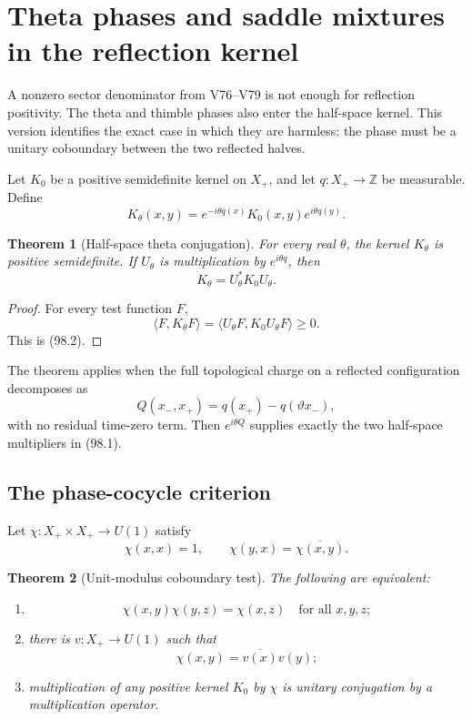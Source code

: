 \documentclass[11pt]{article}
\newtheorem{theorem}{Theorem}[section]
\begin{document}
\section{Theta phases and saddle mixtures in the reflection kernel}
\label{sec:v11v98}

A nonzero sector denominator from V76--V79 is not enough for
reflection positivity.  The theta and thimble phases also enter the
half-space kernel.  This version identifies the exact case in which
they are harmless: the phase must be a unitary coboundary between the
two reflected halves.

Let \(K_0\) be a positive semidefinite kernel on \(X_+\), and let
\(q:X_+\to\mathbb Z\) be measurable.  Define
\[
 K_\theta(x,y)
       =e^{-i\theta q(x)}K_0(x,y)e^{i\theta q(y)}.            \tag{98.1}
\]

\begin{theorem}[Half-space theta conjugation]
\label{thm:v11v98-unitary}
For every real \(\theta\), the kernel \(K_\theta\) is positive
semidefinite.  If \(U_\theta\) is multiplication by
\(e^{i\theta q}\), then
\[
                              K_\theta=U_\theta^*K_0U_\theta. \tag{98.2}
\]
\end{theorem}

\begin{proof}
For every test function \(F\),
\[
 \langle F,K_\theta F\rangle
 =\langle U_\theta F,K_0U_\theta F\rangle\ge0.
\]
This is (98.2).
\end{proof}

The theorem applies when the full topological charge on a reflected
configuration decomposes as
\[
                      Q(x_-,x_+)=q(x_+)-q(\vartheta x_-),    \tag{98.3}
\]
with no residual time-zero term.  Then
\(e^{i\theta Q}\) supplies exactly the two half-space multipliers in
(98.1).

\subsection{The phase-cocycle criterion}

Let \(\chi:X_+\times X_+\to U(1)\) satisfy
\[
 \chi(x,x)=1,\qquad
 \chi(y,x)=\overline{\chi(x,y)}.                             \tag{98.4}
\]

\begin{theorem}[Unit-modulus coboundary test]
\label{thm:v11v98-cocycle}
The following are equivalent:
\begin{enumerate}
\item
\[
                       \chi(x,y)\chi(y,z)=\chi(x,z)
                       \quad\text{for all }x,y,z;            \tag{98.5}
\]
\item there is \(v:X_+\to U(1)\) such that
\[
                              \chi(x,y)=\overline{v(x)}v(y); \tag{98.6}
\]
\item multiplication of any positive kernel \(K_0\) by \(\chi\)
      is unitary conjugation by a multiplication operator.
\end{enumerate}
\end{theorem}
\end{document}
